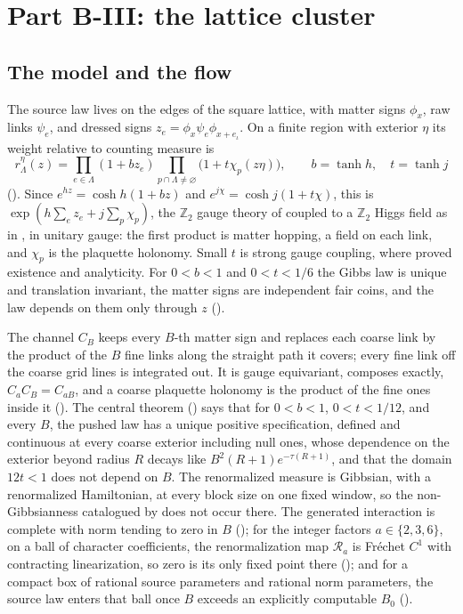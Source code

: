\section{Part B-III: the lattice cluster}
\label{comp:sb-lattice}

\subsection{The model and the flow}
\label{comp:sb-lattice-flow}

The source law lives on the edges of the square lattice, with matter signs \(\phi_x\), raw links \(\psi_e\),
and dressed signs \(z_e=\phi_x\psi_e\phi_{x+e_\iota}\). On a finite region with exterior \(\eta\) its weight
relative to counting measure is
\[
r^\eta_\Lambda(z)=\prod_{e\in\Lambda}(1+bz_e)\prod_{p\cap\Lambda\neq\varnothing}\bigl(1+t\chi_p(z\eta)\bigr),
\qquad b=\tanh h,\quad t=\tanh j
\]
(). Since \(e^{hz}=\cosh h(1+bz)\) and \(e^{j\chi}=\cosh j(1+t\chi)\), this is
\(\exp(h\sum_ez_e+j\sum_p\chi_p)\), the \(\mathbb Z_2\) gauge theory of \citet{Wegner1971} coupled to a
\(\mathbb Z_2\) Higgs field as in \citet{FradkinShenker1979}, in unitary gauge: the first product is matter
hopping, a field on each link, and \(\chi_p\) is the plaquette holonomy. Small \(t\) is strong gauge
coupling, where \citet{OsterwalderSeiler1978} proved existence and analyticity. For \(0<b<1\) and \(0<t<1/6\)
the Gibbs law is unique and translation invariant, the matter signs are independent fair coins, and the
law depends on them only through \(z\) ().

The channel \(C_B\) keeps every \(B\)-th matter sign and replaces each coarse link by the product of the
\(B\) fine links along the straight path it covers; every fine link off the coarse grid lines is integrated
out. It is gauge equivariant, composes exactly, \(C_aC_B=C_{aB}\), and a coarse plaquette holonomy is the
product of the fine ones inside it (). The central theorem
() says that for \(0<b<1\), \(0<t<1/12\), and every \(B\), the
pushed law has a unique positive specification, defined and continuous at every coarse exterior including
null ones, whose dependence on the exterior beyond radius \(R\) decays like \(B^2(R+1)e^{-\tau(R+1)}\), and
that the domain \(12t<1\) does not depend on \(B\). The renormalized measure is Gibbsian, with a
renormalized Hamiltonian, at every block size on one fixed window, so the non-Gibbsianness catalogued by
\citet{VanEnterFernandezSokal1993} does not occur there. The generated interaction is complete with norm tending
to zero in \(B\) (); for the integer factors \(a\in\{2,3,6\}\), on a
ball of character coefficients, the renormalization map \(\mathscr R_a\) is Fréchet \(C^1\) with contracting
linearization, so zero is its only fixed point there (); and for a
compact box of rational source parameters and rational norm parameters, the source law enters that ball once
\(B\) exceeds an explicitly computable \(B_0\) ().

